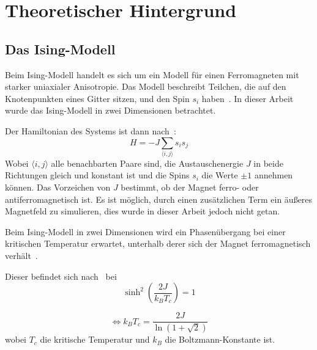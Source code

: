 \chapter{Theoretischer Hintergrund}
	\label{chap:theorie}
	
	\section{Das Ising-Modell}
	\label{sec:isingtheorie}
	Beim Ising-Modell handelt es sich um ein Modell für einen Ferromagneten mit starker uniaxialer Anisotropie. %
	Das Modell beschreibt Teilchen, die auf den Knotenpunkten eines Gitter sitzen, und den Spin $s_i$ haben~\cite[S. 7]{binderheermann}. In dieser Arbeit wurde das Ising-Modell in zwei Dimensionen betrachtet. 
	
	Der Hamiltonian des Systems ist dann nach~\cite[S. 7]{binderheermann}:
	\begin{equation}
	H=-J\sum_{\langle i,j\rangle }s_is_j
	\label{eq:hamiltonianising}
	\end{equation}
	Wobei $\langle i,j\rangle$ alle benachbarten Paare sind, die Austauschenergie $J$ in beide Richtungen gleich und konstant ist und die Spins $s_i$ die  Werte $\pm 1$ annehmen können. Das Vorzeichen von $J$ bestimmt, ob der Magnet ferro- oder antiferromagnetisch ist. Es ist möglich, durch einen zusätzlichen Term ein äußeres Magnetfeld zu simulieren, dies wurde in dieser Arbeit jedoch nicht getan.%

	
	Beim Ising-Modell in zwei Dimensionen wird ein Phasenübergang bei einer kritischen Temperatur erwartet, unterhalb derer sich der Magnet ferromagnetisch verhält~\cite[vgl. ][]{peierls_1936}.
	
	Dieser befindet sich nach~\cite{OnsagerCrystal1} bei \[\sinh^2\left(\frac{2J}{k_BT_c}\right) =1\]
	
	\begin{equation}
	\Leftrightarrow k_BT_c=\frac{2J}{\ln(1+\sqrt{2})}
	\label{eq:kritischetemperatur}
	\end{equation}
	wobei $T_c$ die kritische Temperatur und $k_B$ die Boltzmann-Konstante ist.
	
